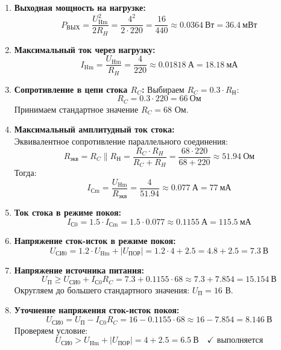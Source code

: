 \begin{enumerate}
    \item \textbf{Выходная мощность на нагрузке:}
    $$
    P_\text{ВЫХ} = \frac{U_\text{Hm}^2}{2 R_H} = \frac{4^2}{2 \cdot 220} = \frac{16}{440} \approx 0.0364\ \text{Вт} = 36.4\ \text{мВт}
    $$
    
    \item \textbf{Максимальный ток через нагрузку:}
    $$
    I_\text{Hm} = \frac{U_\text{Hm}}{R_H} = \frac{4}{220} \approx 0.01818\ \text{А} = 18.18\ \text{мА}
    $$
    
    \item \textbf{Сопротивление в цепи стока $R_C$:}
    Выбираем $R_C = 0.3 \cdot R_Н$:
    $$
    R_C = 0.3 \cdot 220 = 66\ \text{Ом}
    $$
    Принимаем стандартное значение $R_C = 68$ Ом.
    
    \item \textbf{Максимальный амплитудный ток стока:}\\
    Эквивалентное сопротивление параллельного соединения:
    $$
    R_\text{экв} = R_C \parallel R_Н = \frac{R_C \cdot R_H}{R_C + R_H} = \frac{68 \cdot 220}{68 + 220} \approx 51.94\ \text{Ом}
    $$
    Тогда:
    $$
    I_\text{Сm} = \frac{U_\text{Hm}}{R_\text{экв}} = \frac{4}{51.94} \approx 0.077\ \text{А} = 77\ \text{мА}
    $$
    
    \item \textbf{Ток стока в режиме покоя:}
    $$
    I_\text{С0} = 1.5 \cdot I_\text{Сm} = 1.5 \cdot 0.077 \approx 0.1155\ \text{А} = 115.5\ \text{мА}
    $$
    
    \item \textbf{Напряжение сток-исток в режиме покоя:}
    $$
    U_\text{СИ0} = 1.2 \cdot U_\text{Hm} + |U_\text{ПОР}| = 1.2 \cdot 4 + 2.5 = 4.8 + 2.5 = 7.3\ \text{В}
    $$
    
    \item \textbf{Напряжение источника питания:}
    $$
    U_\text{П} \geq U_\text{СИ0} + I_\text{С0} R_C = 7.3 + 0.1155 \cdot 68 \approx 7.3 + 7.854 = 15.154\ \text{В}
    $$
    Округляем до большего стандартного значения: $U_\text{П} = 16$ В.
    
    \item \textbf{Уточнение напряжения сток-исток покоя:}
    $$
    U_\text{СИ0} = U_\text{П} - I_\text{С0} R_C = 16 - 0.1155 \cdot 68 \approx 16 - 7.854 = 8.146\ \text{В}
    $$
    Проверяем условие:
    $$
    U_\text{СИ0} > U_\text{Hm} + |U_\text{ПОР}| = 4 + 2.5 = 6.5\ \text{В} \quad \text{✓ выполняется}
    $$
\end{enumerate}

